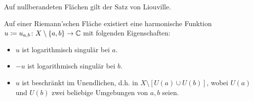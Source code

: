 \begin{frame}
    \begin{lemma}
        Auf nullberandeten Flächen gilt der Satz von Liouville.
    \end{lemma}
    \begin{lemma}
        Auf einer Riemann'schen Fläche existiert eine harmonische Funktion $u \coloneqq u_{a,b} \colon X \setminus \{a, b\} \to \mathbb{C}$ mit folgenden Eigenschaften:
        \begin{itemize}
            \item $u$ ist logarithmisch singulär bei $a$.
            \item $-u$ ist logarithmisch singulär bei $b$.
            \item $u$ ist beschränkt im Unendlichen, d.h. in $X \setminus [U (a) \cup U (b)]$, wobei $U(a)$ und $U(b)$ zwei beliebige Umgebungen von $a, b$ seien.
        \end{itemize}
    \end{lemma}
\end{frame}